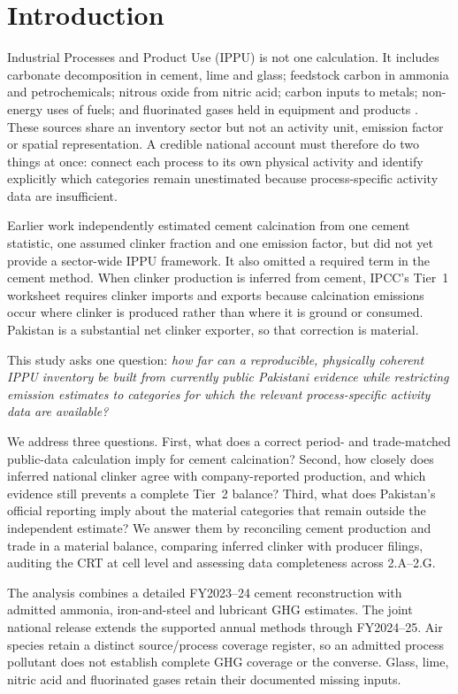 \section{Introduction}
\label{sec:intro}

Industrial Processes and Product Use (IPPU) is not one calculation. It includes carbonate
decomposition in cement, lime and glass; feedstock carbon in ammonia and petrochemicals;
nitrous oxide from nitric acid; carbon inputs to metals; non-energy uses of fuels; and
fluorinated gases held in equipment and products \citep{ipcc2006ippu,ipcc2019}. These sources
share an inventory sector but not an activity unit, emission factor or spatial representation.
A credible national account must therefore do two things at once: connect each process to its
own physical activity and identify explicitly which categories remain unestimated because
process-specific activity data are insufficient.

Earlier work independently estimated cement calcination from one cement statistic, one
assumed clinker fraction and one emission factor, but did not yet provide a sector-wide IPPU
framework. It also omitted a required term in the cement method. When clinker production is inferred from cement,
IPCC's Tier~1 worksheet requires clinker imports and exports because calcination emissions
occur where clinker is produced rather than where it is ground or consumed. Pakistan is a
substantial net clinker exporter, so that correction is material.

This study asks one question: \emph{how far can a reproducible, physically coherent IPPU
inventory be built from currently public Pakistani evidence while restricting emission
estimates to categories for which the relevant process-specific activity data are available?}

We address three questions. First, what does a correct period- and trade-matched public-data
calculation imply for cement calcination? Second, how closely does inferred national clinker
agree with company-reported production, and which evidence still prevents a complete Tier~2
balance? Third, what does Pakistan's official reporting imply about the material categories
that remain outside the independent estimate? We answer them by reconciling cement production
and trade in a material balance, comparing inferred clinker with producer filings, auditing
the CRT at cell level and assessing data completeness across 2.A--2.G.

The analysis combines a detailed FY2023--24 cement reconstruction with admitted ammonia, iron-and-steel and lubricant GHG estimates. The joint national release extends the supported annual methods through FY2024--25. Air species retain a distinct source/process coverage register, so an admitted process pollutant does not establish complete GHG coverage or the converse. Glass, lime, nitric acid and fluorinated gases retain their documented missing inputs.
